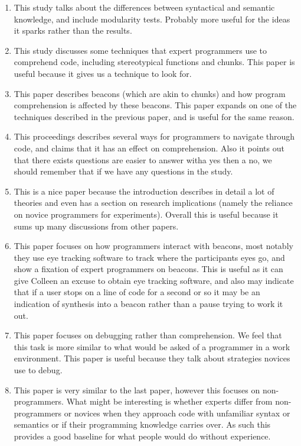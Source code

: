 \documentclass{article}
\begin{document}
\begin{enumerate}
\item This study talks about the differences between syntactical and semantic knowledge, and include modularity tests. Probably more useful for the ideas it sparks rather than the results. \cite{schneiderman1979}

\item This study discusses some techniques that expert programmers use to comprehend code, including stereotypical functions and chunks. This paper is useful because it gives us a technique to look for. \cite{soloway1984}

\item This paper describes beacons (which are akin to chunks) and how program comprehension is affected by these beacons. This paper expands on one of the techniques described in the previous paper, and is useful for the same reason. \cite{wiedenbeck1991}

\item This proceedings describes several ways for programmers to navigate through code, and claims that it has an effect on comprehension. Also it points out that there exists questions are easier to answer witha yes then a no, we should remember that if we have any questions in the study. \cite{mosemann2001}

\item This is a nice paper because the introduction describes in detail a lot of theories and even has a section on research implications (namely the reliance on novice programmers for experiments). Overall this is useful because it sums up many discussions from other papers. \cite{storey2005}

\item This paper focuses on how programmers interact with beacons, most notably they use eye tracking software to track where the participants eyes go, and show a fixation of expert programmers on beacons.
This is useful as it can give Colleen an excuse to obtain eye tracking software, and also may indicate that if a user stops on a line of code for a second or so it may be an indication of synthesis into a beacon rather than a pause trying to work it out. \cite{aschwanden2006}

\item This paper focuses on debugging rather than comprehension. We feel that this task is more similar to what would be asked of a programmer in a work environment.
This paper is useful because they talk about strategies novices use to debug. \cite{fitzgerald2008}

\item This paper is very similar to the last paper, however this focuses on non-programmers.
What might be interesting is whether experts differ from non-programmers or novices when they approach code with unfamiliar syntax or semantics or if their programming knowledge carries over.
As such this provides a good baseline for what people would do without experience.
\cite{gross2009}

\end{enumerate}


\end{document}
